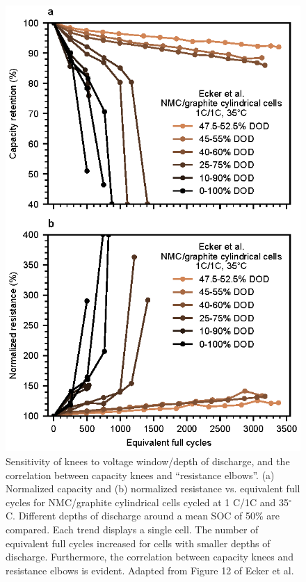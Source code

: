 \documentclass[journal=jpclcd,manuscript=article]{achemso}
\begin{document}
\begin{figure}[ht!]
\centering
\includegraphics[scale=1.0]{figures/ecker_remade.eps}
\caption{Sensitivity of knees to voltage window/depth of discharge, and the correlation between capacity knees and ``resistance elbows''.
(a) Normalized capacity and (b) normalized resistance vs. equivalent full cycles for NMC/graphite cylindrical cells cycled at 1 C/1C and 35$^{\circ}$C.
Different depths of discharge around a mean SOC of 50\% are compared. Each trend displays a single cell. The number of equivalent full cycles increased for cells with smaller depths of discharge. Furthermore, the correlation between capacity knees and resistance elbows is evident.
Adapted from Figure 12 of Ecker et al.\cite{ecker_calendar_2014}
}
\label{fig:ecker_capacity_and_resistance}
\end{figure}
\end{document}
